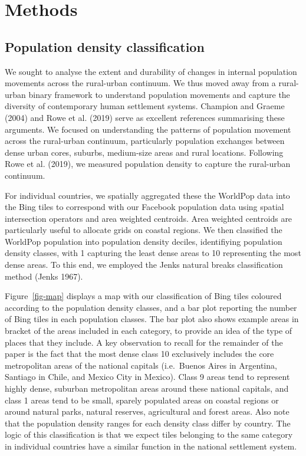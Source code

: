\documentclass[
  11pt,
]{article}
\begin{document}
\hypertarget{sec-methods}{%
\section{Methods}\label{sec-methods}}

\hypertarget{sec-methods1}{%
\subsection{Population density classification}\label{sec-methods1}}

We sought to analyse the extent and durability of changes in internal
population movements across the rural-urban continuum. We thus moved
away from a rural-urban binary framework to understand population
movements and capture the diversity of contemporary human settlement
systems. Champion and Graeme (2004) and Rowe et al. (2019) serve as
excellent references summarising these arguments. We focused on
understanding the patterns of population movement across the rural-urban
continuum, particularly population exchanges between dense urban cores,
suburbs, medium-size areas and rural locations. Following Rowe et al.
(2019), we measured population density to capture the rural-urban
continuum.

For individual countries, we spatially aggregated these the WorldPop
data into the Bing tiles to correspond with our Facebook population data
using spatial intersection operators and area weighted centroids. Area
weighted centroids are particularly useful to allocate grids on coastal
regions. We then classified the WorldPop population into population
density deciles, identifiying population density classes, with 1
capturing the least dense areas to 10 representing the most dense areas.
To this end, we employed the Jenks natural breaks classification method
(Jenks 1967).

Figure~\ref{fig-map} displays a map with our classification of Bing
tiles coloured according to the population density classes, and a bar
plot reporting the number of Bing tiles in each population classes. The
bar plot also shows example areas in bracket of the areas included in
each category, to provide an idea of the type of places that they
include. A key observation to recall for the remainder of the paper is
the fact that the most dense class 10 exclusively includes the core
metropolitan areas of the national capitals (i.e.~Buenos Aires in
Argentina, Santiago in Chile, and Mexico City in Mexico). Class 9 areas
tend to represent highly dense, suburban metropolitan areas around these
national capitals, and class 1 areas tend to be small, sparely populated
areas on coastal regions or around natural parks, natural reserves,
agricultural and forest areas. Also note that the population density
ranges for each density class differ by country. The logic of this
classification is that we expect tiles belonging to the same category in
individual countries have a similar function in the national settlement
system.
\end{document}
